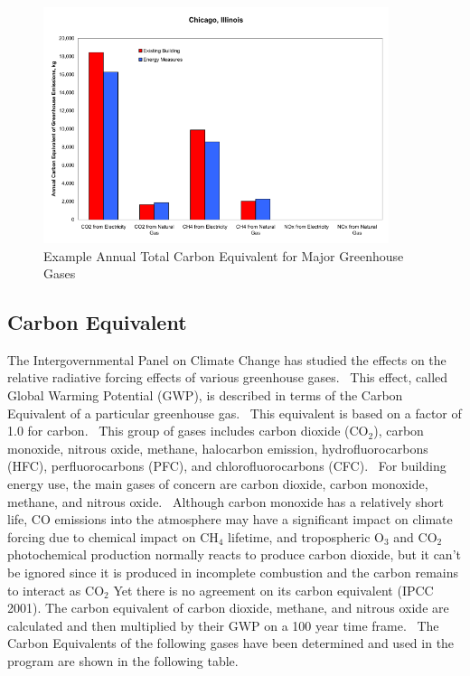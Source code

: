 \begin{figure}[hbtp] %
\centering
\includegraphics[width=0.9\textwidth, height=0.9\textheight, keepaspectratio=true]{media/image7911.svg.png}
\caption{Example Annual Total Carbon Equivalent for Major Greenhouse Gases \protect \label{fig:example-annual-total-carbon-equivalent-for}}
\end{figure}

\subsection{Carbon Equivalent}\label{carbon-equivalent}

The Intergovernmental Panel on Climate Change has studied the effects on the relative radiative forcing effects of various greenhouse gases.~ This effect, called Global Warming Potential (GWP), is described in terms of the Carbon Equivalent of a particular greenhouse gas.~ This equivalent is based on a factor of 1.0 for carbon.~ This group of gases includes carbon dioxide (CO\(_{2}\)), carbon monoxide, nitrous oxide, methane, halocarbon emission, hydrofluorocarbons (HFC), perfluorocarbons (PFC), and chlorofluorocarbons (CFC).~ For building energy use, the main gases of concern are carbon dioxide, carbon monoxide, methane, and nitrous oxide.~ Although carbon monoxide has a relatively short life, CO emissions into the atmosphere may have a significant impact on climate forcing due to chemical impact on CH\(_{4}\) lifetime, and tropospheric O\(_{3}\) and CO\(_{2}\) photochemical production normally reacts to produce carbon dioxide, but it can't be ignored since it is produced in incomplete combustion and the carbon remains to interact as CO\(_{2}\) Yet there is no agreement on its carbon equivalent (IPCC 2001). The carbon equivalent of carbon dioxide, methane, and nitrous oxide are calculated and then multiplied by their GWP on a 100 year time frame.~ The Carbon Equivalents of the following gases have been determined and used in the program are shown in the following table.

